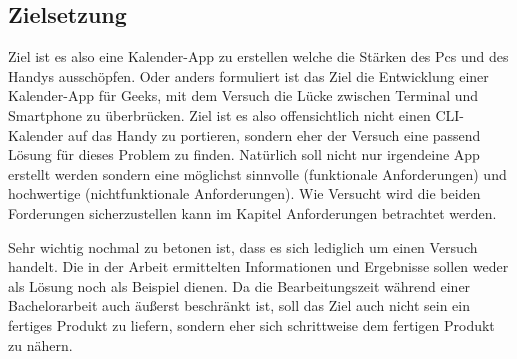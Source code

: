 \subsection{Zielsetzung}

Ziel ist es also eine Kalender-App zu erstellen welche die Stärken des Pcs und des Handys ausschöpfen. Oder anders formuliert ist das Ziel die Entwicklung einer Kalender-App für Geeks, mit dem Versuch die Lücke zwischen Terminal und Smartphone zu überbrücken. Ziel ist es also offensichtlich nicht einen CLI-Kalender auf das Handy zu portieren, sondern eher der Versuch eine passend Lösung für dieses Problem zu finden. \newline
Natürlich soll nicht nur irgendeine App erstellt werden sondern eine möglichst sinnvolle (funktionale Anforderungen) und hochwertige (nichtfunktionale Anforderungen). Wie Versucht wird die beiden Forderungen sicherzustellen kann im Kapitel \myTodo Anforderungen betrachtet werden.

\myNewSection
Sehr wichtig nochmal zu betonen ist, dass es sich lediglich um einen Versuch handelt. Die in der Arbeit ermittelten Informationen und Ergebnisse sollen weder als Lösung noch als Beispiel dienen. 
Da die Bearbeitungszeit während einer Bachelorarbeit auch äußerst beschränkt ist, soll das Ziel auch nicht sein ein fertiges Produkt zu liefern, sondern eher sich schrittweise dem fertigen Produkt zu nähern.


